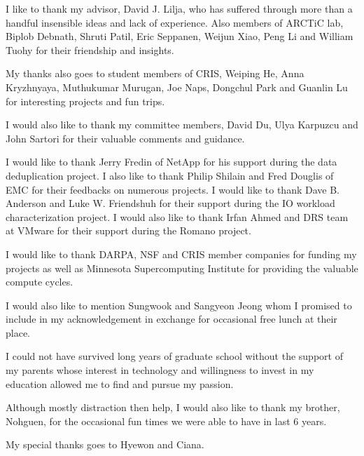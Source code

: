 
I like to thank my advisor, David J. Lilja, who has suffered through more than a handful insensible ideas and lack of experience. Also members of ARCTiC lab, Biplob Debnath, Shruti Patil, Eric Seppanen, Weijun Xiao, Peng Li and William Tuohy for their friendship and insights. 

My thanks also goes to student members of CRIS, Weiping He, Anna Kryzhnyaya, Muthukumar Murugan, Joe Naps, Dongchul Park and Guanlin Lu for interesting projects and fun trips. 

I would also like to thank my committee members, David Du, Ulya Karpuzcu and John Sartori for their valuable comments and guidance. 
 
I would like to thank Jerry Fredin of NetApp for his support during the data deduplication project. 
I also like to thank Philip Shilain and Fred Douglis of EMC for their feedbacks on numerous projects. 
I would like to thank Dave B. Anderson and Luke W. Friendshuh for their support during the IO workload characterization project.
I would also like to thank Irfan Ahmed and DRS team at VMware for their support during the Romano project. 

I would like to thank DARPA, NSF and CRIS member companies for funding my projects as well as Minnesota Supercomputing Institute for providing the valuable compute cycles. 

I would also like to mention Sungwook and Sangyeon Jeong whom I promised to include in my acknowledgement in exchange for occasional free lunch at their place. 

I could not have survived long years of graduate school without the support of my parents whose interest in technology and willingness to invest in my education allowed me to find and pursue my passion. 

Although mostly distraction then help, I would also like to thank my brother, Nohguen, for the occasional fun times we were able to have in last 6 years. 

My special thanks goes to Hyewon and Ciana. 

